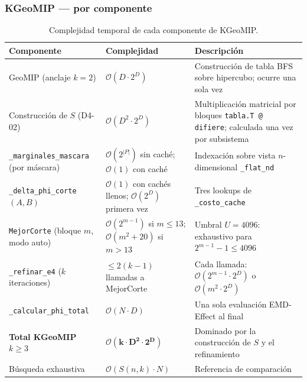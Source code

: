 \subsubsection*{KGeoMIP — por componente}

\begin{table}[H]
  \centering
  \caption{Complejidad temporal de cada componente de KGeoMIP.}
  \label{tab:complejidad_kgeomip}
  \begin{tabular}{p{4.2cm} p{3.5cm} p{5.5cm}}
    \toprule
    \textbf{Componente} & \textbf{Complejidad} & \textbf{Descripción} \\
    \midrule
    GeoMIP (anclaje $k=2$)
      & $\mathcal{O}(D \cdot 2^D)$
      & Construcción de tabla BFS sobre hipercubo; ocurre una sola vez \\[3pt]

    Construcción de $S$ (D4-02)
      & $\mathcal{O}(D^2 \cdot 2^D)$
      & Multiplicación matricial por bloques \texttt{tabla.T @ difiere};
        calculada una vez por subsistema \\[3pt]

    \texttt{\_marginales\_mascara} (por máscara)
      & $\mathcal{O}(2^{|P|})$ sin caché; $\mathcal{O}(1)$ con caché
      & Indexación sobre vista $n$-dimensional \texttt{\_flat\_nd} \\[3pt]

    \texttt{\_delta\_phi\_corte}$(A, B)$
      & $\mathcal{O}(1)$ con cachés llenos; $\mathcal{O}(2^D)$ primera vez
      & Tres lookups de \texttt{\_costo\_cache} \\[3pt]

    \texttt{MejorCorte} (bloque $m$, modo auto)
      & $\mathcal{O}(2^{m-1})$ si $m \leq 13$; $\mathcal{O}(m^2 + 20)$ si $m > 13$
      & Umbral $U = 4096$: exhaustivo para $2^{m-1}-1 \leq 4096$ \\[3pt]

    \texttt{\_refinar\_e4} ($k$ iteraciones)
      & $\leq 2(k{-}1)$ llamadas a MejorCorte
      & Cada llamada: $\mathcal{O}(2^{m-1} \cdot 2^D)$ o $\mathcal{O}(m^2 \cdot 2^D)$ \\[3pt]

    \texttt{\_calcular\_phi\_total}
      & $\mathcal{O}(N \cdot D)$
      & Una sola evaluación EMD-Effect al final \\[3pt]

    \midrule
    \textbf{Total KGeoMIP} $k \geq 3$
      & $\boldsymbol{\mathcal{O}(k \cdot D^2 \cdot 2^D)}$
      & Dominado por la construcción de $S$ y el refinamiento \\[3pt]

    Búsqueda exhaustiva
      & $\mathcal{O}(S(n,k) \cdot N)$
      & Referencia de comparación \\
    \bottomrule
  \end{tabular}
\end{table}

